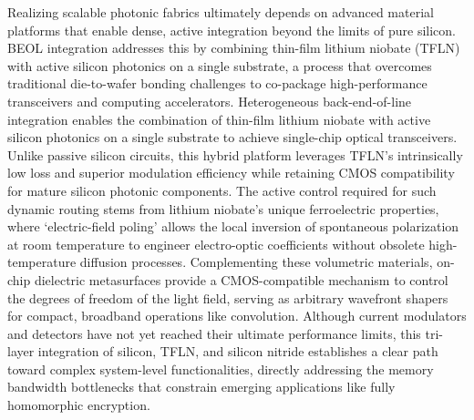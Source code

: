 Realizing scalable photonic fabrics ultimately depends on advanced material platforms that enable dense, active integration beyond the limits of pure silicon. BEOL integration addresses this by combining thin-film lithium niobate (TFLN) with active silicon photonics on a single substrate, a process that overcomes traditional die-to-wafer bonding challenges to co-package high-performance transceivers and computing accelerators. Heterogeneous back-end-of-line integration enables the combination of thin-film lithium niobate with active silicon photonics on a single substrate to achieve single-chip optical transceivers. \citep{s2_9b444e84d20ae6e3d62d2d4df30268b5a53baad2_40af2cc9} Unlike passive silicon circuits, this hybrid platform leverages TFLN's intrinsically low loss and superior modulation efficiency while retaining CMOS compatibility for mature silicon photonic components. The active control required for such dynamic routing stems from lithium niobate's unique ferroelectric properties, where `electric-field poling' allows the local inversion of spontaneous polarization at room temperature to engineer electro-optic coefficients without obsolete high-temperature diffusion processes. \citep{s2_a1b7de5981aa9a6aa9f9bd0c4422d9b023fc454f_bec494c5} \citep{doi_10_1117_12_2654937_d0b4bc2b} Complementing these volumetric materials, on-chip dielectric metasurfaces provide a CMOS-compatible mechanism to control the degrees of freedom of the light field, serving as arbitrary wavefront shapers for compact, broadband operations like convolution. Although current modulators and detectors have not yet reached their ultimate performance limits, this tri-layer integration of silicon, TFLN, and silicon nitride establishes a clear path toward complex system-level functionalities, directly addressing the memory bandwidth bottlenecks that constrain emerging applications like fully homomorphic encryption. \citep{s2_9b444e84d20ae6e3d62d2d4df30268b5a53baad2_40af2cc9} \citep{doi_10_1126_science_abj4396_40f36a09} \citep{doi_10_1515_nanoph_2022_0294_1bd118d5} \citep{doi_10_1145_3806395_315ab915}

